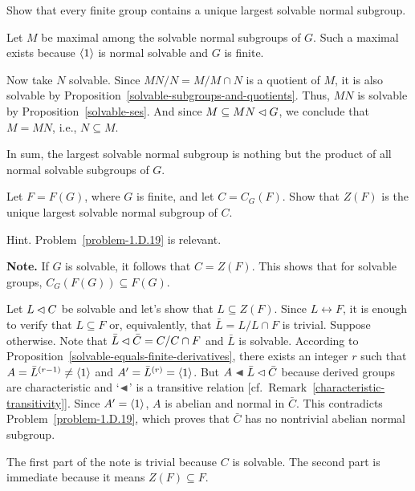 \begin{probl}
    Show that every finite group contains a unique largest solvable normal subgroup.
\end{probl}

\begin{solution} Let $M$ be maximal among the solvable normal subgroups of $G$. Such a maximal exists because $\langle1\rangle$ is normal solvable and $G$ is finite.

Now take $N$ solvable. Since $MN/N=M/M\cap N$ is a quotient of $M$, it is also solvable by Proposition~\ref{solvable-subgroups-and-quotients}. Thus, $MN$ is solvable by Proposition~\ref{solvable-ses}. And since $M\subseteq MN\lhd G$, we conclude that $M=MN$, i.e., $N\subseteq M$. 

In sum, the largest solvable normal subgroup is nothing but the product of all normal solvable subgroups of $G$. \end{solution}

\begin{probl}
    Let\/ $F = F(G)$, where\/ $G$ is finite, and let\/ $C = C_G(F)$. Show that\/ $Z(F)$ is the unique largest solvable normal subgroup of\/ $C$.

    \textrm{\rm Hint. Problem~\ref{problem-1.D.19} is relevant.}
    
    \textrm{\rm\textbf{Note.} If $G$ is solvable, it follows that $C = Z(F)$. This shows that for solvable groups, $C_G(F(G))\subseteq F(G)$.}
\end{probl}

\begin{solution} 
Let $L\lhd C$ be solvable and let's show that $L\subseteq Z(F)$. Since $L\leftrightarrow F$, it is enough to verify that $L\subseteq F$ or, equivalently, that $\bar L=L/L\cap F$ is trivial. Suppose otherwise. Note that $\bar L\lhd\bar C=C/C\cap F$ and $\bar L$ is solvable. According to Proposition~\ref{solvable-equals-finite-derivatives}, there exists an integer $r$ such that $A=\bar L^{(r-1)}\ne\langle1\rangle$ and $A'=\bar L^{(r)}=\langle1\rangle$. But $A\ch\bar L\normal\bar C$ because derived groups are characteristic and `$\ch$' is a transitive relation [cf.~Remark~\ref{characteristic-transitivity}]. Since $A'=\langle1\rangle$, $A$ is abelian and normal in $\bar C$. This contradicts Problem~\ref{problem-1.D.19}, which proves that $\bar C$ has no nontrivial abelian normal subgroup.

The first part of the note is trivial because $C$ is solvable. The second part is immediate because it means $Z(F)\subseteq F$.  \end{solution}

